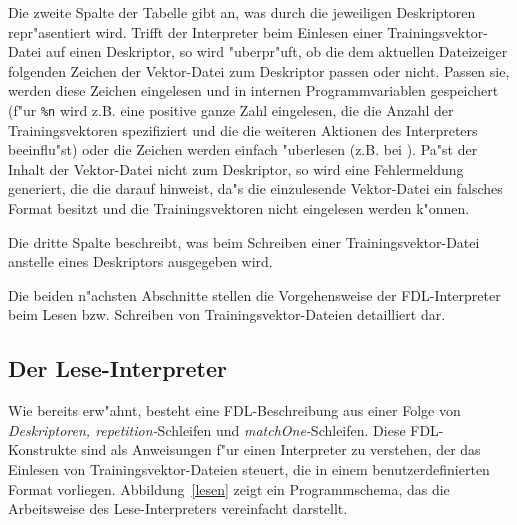 Die zweite Spalte der Tabelle gibt an, was durch die jeweiligen Deskriptoren
repr"asentiert wird.
Trifft der Interpreter beim Einlesen einer Trainingsvektor-Datei auf
einen Deskriptor, so wird "uberpr"uft, ob die dem aktuellen Dateizeiger 
folgenden Zeichen der Vektor-Datei zum Deskriptor passen oder nicht.
Passen sie, werden diese Zeichen eingelesen und in
internen Programmvariablen gespeichert (f"ur {\tt \%n} wird z.B. eine
positive ganze Zahl eingelesen, die die Anzahl der Trainingsvektoren
spezifiziert und die die weiteren Aktionen des Interpreters beeinflu"st)
oder die Zeichen werden einfach "uberlesen (z.B. bei {\tt *}).   
Pa"st der Inhalt der Vektor-Datei nicht zum Deskriptor, so wird
eine Fehlermeldung generiert, die die darauf hinweist, da"s die einzulesende
Vektor-Datei ein falsches Format besitzt und die Trainingsvektoren
nicht eingelesen werden k"onnen.

Die dritte Spalte beschreibt, was beim Schreiben einer Trainingsvektor-Datei
anstelle eines Deskriptors ausgegeben wird.

Die beiden n"achsten Abschnitte stellen die Vorgehensweise der
FDL-Interpreter beim Lesen bzw. Schreiben von Trainingsvektor-Dateien
detailliert dar. 

\newpage
\subsection{Der Lese-Interpreter}

Wie bereits erw"ahnt, besteht eine FDL-Beschreibung aus einer 
Folge von {\it Deskriptoren, repetition-}Schleifen und 
{\it matchOne-}Schleifen.
Diese FDL-Konstrukte sind als Anweisungen f"ur einen Interpreter 
zu verstehen, der das Einlesen von Trainingsvektor-Dateien 
steuert, die in einem benutzerdefinierten Format vorliegen. 
Abbildung~\ref{lesen} zeigt ein Programmschema, das die Arbeitsweise 
des Lese-Interpreters vereinfacht darstellt. 

